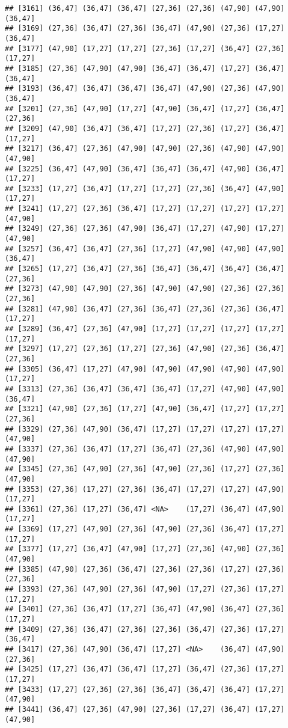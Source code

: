 \documentclass[12pt,]{article}
\begin{document}
\begin{verbatim}
## [3161] (36,47] (36,47] (36,47] (27,36] (27,36] (47,90] (47,90] (36,47]
## [3169] (27,36] (36,47] (27,36] (36,47] (47,90] (27,36] (17,27] (36,47]
## [3177] (47,90] (17,27] (17,27] (27,36] (17,27] (36,47] (27,36] (17,27]
## [3185] (27,36] (47,90] (47,90] (36,47] (36,47] (17,27] (36,47] (36,47]
## [3193] (36,47] (36,47] (36,47] (36,47] (47,90] (27,36] (47,90] (36,47]
## [3201] (27,36] (47,90] (17,27] (47,90] (36,47] (17,27] (36,47] (27,36]
## [3209] (47,90] (36,47] (36,47] (17,27] (27,36] (17,27] (36,47] (17,27]
## [3217] (36,47] (27,36] (47,90] (47,90] (27,36] (47,90] (47,90] (47,90]
## [3225] (36,47] (47,90] (36,47] (36,47] (36,47] (47,90] (36,47] (17,27]
## [3233] (17,27] (36,47] (17,27] (17,27] (27,36] (36,47] (47,90] (17,27]
## [3241] (17,27] (27,36] (36,47] (17,27] (17,27] (17,27] (17,27] (47,90]
## [3249] (27,36] (27,36] (47,90] (36,47] (17,27] (47,90] (17,27] (47,90]
## [3257] (36,47] (36,47] (27,36] (17,27] (47,90] (47,90] (47,90] (36,47]
## [3265] (17,27] (36,47] (27,36] (36,47] (36,47] (36,47] (36,47] (27,36]
## [3273] (47,90] (47,90] (27,36] (47,90] (47,90] (27,36] (27,36] (27,36]
## [3281] (47,90] (36,47] (27,36] (36,47] (27,36] (27,36] (36,47] (17,27]
## [3289] (36,47] (27,36] (47,90] (17,27] (17,27] (17,27] (17,27] (17,27]
## [3297] (17,27] (27,36] (17,27] (27,36] (47,90] (27,36] (36,47] (27,36]
## [3305] (36,47] (17,27] (47,90] (47,90] (47,90] (47,90] (47,90] (17,27]
## [3313] (27,36] (36,47] (36,47] (36,47] (17,27] (47,90] (47,90] (36,47]
## [3321] (47,90] (27,36] (17,27] (47,90] (36,47] (17,27] (17,27] (27,36]
## [3329] (27,36] (47,90] (36,47] (17,27] (17,27] (17,27] (17,27] (47,90]
## [3337] (27,36] (36,47] (17,27] (36,47] (27,36] (47,90] (47,90] (47,90]
## [3345] (27,36] (47,90] (27,36] (47,90] (27,36] (17,27] (27,36] (47,90]
## [3353] (27,36] (17,27] (27,36] (36,47] (17,27] (17,27] (47,90] (17,27]
## [3361] (27,36] (17,27] (36,47] <NA>    (17,27] (36,47] (47,90] (17,27]
## [3369] (17,27] (47,90] (27,36] (47,90] (27,36] (36,47] (17,27] (17,27]
## [3377] (17,27] (36,47] (47,90] (17,27] (27,36] (47,90] (27,36] (47,90]
## [3385] (47,90] (27,36] (36,47] (27,36] (27,36] (17,27] (27,36] (27,36]
## [3393] (27,36] (47,90] (27,36] (47,90] (17,27] (27,36] (17,27] (17,27]
## [3401] (27,36] (36,47] (17,27] (36,47] (47,90] (36,47] (27,36] (17,27]
## [3409] (27,36] (36,47] (27,36] (27,36] (36,47] (27,36] (17,27] (36,47]
## [3417] (27,36] (47,90] (36,47] (17,27] <NA>    (36,47] (47,90] (27,36]
## [3425] (17,27] (36,47] (36,47] (17,27] (36,47] (27,36] (17,27] (17,27]
## [3433] (17,27] (27,36] (27,36] (36,47] (36,47] (36,47] (17,27] (47,90]
## [3441] (36,47] (27,36] (47,90] (27,36] (17,27] (36,47] (17,27] (47,90]

\end{verbatim}
\end{document}

